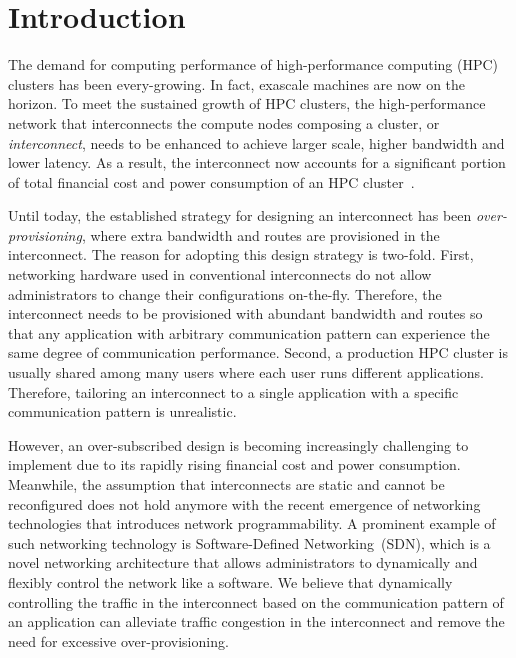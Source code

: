 \documentclass[graybox]{svmult}
\begin{document}
\section{Introduction}\label{kt:sec:i}

The demand for computing performance of high-performance computing (HPC)
clusters has been every-growing. In fact, exascale machines are now on the
horizon. To meet the sustained growth of HPC clusters, the high-performance
network that interconnects the compute nodes composing a cluster, or
\textit{interconnect}, needs to be enhanced to achieve larger scale, higher
bandwidth and lower latency. As a result, the interconnect now accounts for a
significant portion of total financial cost and power consumption of an HPC
cluster~\cite{Michelogiannakis2017}.

Until today, the established strategy for designing an interconnect has been
\textit{over-provisioning}, where extra bandwidth and routes are provisioned
in the interconnect. The reason for adopting this design strategy is two-fold.
First, networking hardware used in conventional interconnects do not allow
administrators to change their configurations on-the-fly. Therefore, the
interconnect needs to be provisioned with abundant bandwidth and routes so
that any application with arbitrary communication pattern can experience the
same degree of communication performance. Second, a production HPC cluster is
usually shared among many users where each user runs different applications.
Therefore, tailoring an interconnect to a single application with a specific
communication pattern is unrealistic.

However, an over-subscribed design is becoming increasingly challenging to
implement due to its rapidly rising financial cost and power consumption.
Meanwhile, the assumption that interconnects are static and cannot be
reconfigured does not hold anymore with the recent emergence of networking
technologies that introduces network programmability. A prominent example of
such networking technology is Software-Defined Networking~(SDN), which is a
novel networking architecture that allows administrators to dynamically and
flexibly control the network like a software. We believe that dynamically
controlling the traffic in the interconnect based on the communication pattern
of an application can alleviate traffic congestion in the interconnect and
remove the need for excessive over-provisioning.
\end{document}
